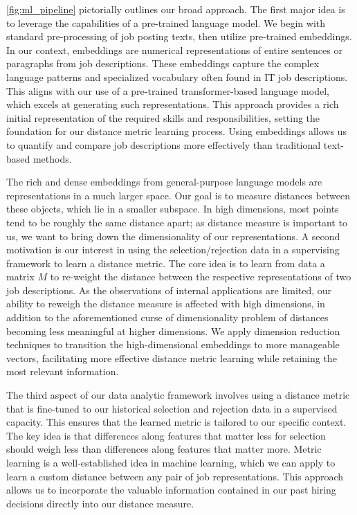 \autoref{fig:ml_pipeline} pictorially outlines our broad approach. The first major idea is to leverage the capabilities of a pre-trained language model. We begin with standard pre-processing of job posting texts, then utilize pre-trained embeddings. In our context, embeddings are numerical representations of entire sentences or paragraphs from job descriptions. These embeddings capture the complex language patterns and specialized vocabulary often found in IT job descriptions. This aligns with our use of a pre-trained transformer-based language model, which excels at generating such representations. This approach provides a rich initial representation of the required skills and responsibilities, setting the foundation for our distance metric learning process. Using embeddings allows us to quantify and compare job descriptions more effectively than traditional text-based methods.

The rich and dense embeddings from general-purpose language models are representations in a much larger space. Our goal is to measure distances between these objects, which lie in a smaller subspace. In high dimensions, most points tend to be roughly the same distance apart; as distance measure is important to us, we want to bring down the dimensionality of our representations. A second motivation is our interest in using the selection/rejection data in a supervising framework to learn a distance metric. The core idea is to learn from data a matrix $M$ to re-weight the distance between the respective representations of two job descriptions. As the observations of internal applications are limited, our ability to reweigh the distance measure is affected with high dimensions, in addition to the aforementioned curse of dimensionality problem of distances becoming less meaningful at higher dimensions. We apply dimension reduction techniques to transition the high-dimensional embeddings to more manageable vectors, facilitating more effective distance metric learning while retaining the most relevant information.


The third aspect of our data analytic framework involves using a distance metric that is fine-tuned to our historical selection and rejection data in a supervised capacity. This ensures that the learned metric is tailored to our specific context. The key idea is that differences along features that matter less for selection should weigh less than differences along features that matter more. Metric learning is a well-established idea in machine learning, which we can apply to learn a custom distance between any pair of job representations. This approach allows us to incorporate the valuable information contained in our past hiring decisions directly into our distance measure.

